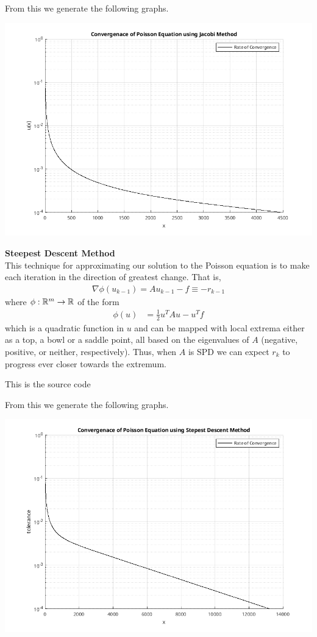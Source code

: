 \documentclass[12pt,a4paper]{report}
\begin{document}
From this we generate the following graphs.%

\includegraphics[scale=0.5]{ml04c.png} 

\noindent\textbf{Steepest Descent Method}\\

This technique for approximating our solution to the Poisson equation is to make each iteration in the direction of greatest change.  That is, 
\begin{align*}
	\nabla \phi(u_{k-1}) = Au_{k-1}-f \equiv -r_{k-1}
\end{align*}where $\phi: \mathbb{R}^m \to \mathbb{R}$ of the form
\begin{align*}
	\phi(u) &= \frac{1}{2}u^TAu-u^Tf
\end{align*}which is a quadratic function in $u$ and can be mapped with local extrema either as a top, a bowl or a saddle point, all based on the eigenvalues of $A$ (negative, positive, or neither, respectively).  Thus, when $A$ is SPD we can expect $r_{k}$ to progress ever closer towards the extremum.

This is the source code
	

From this we generate the following graphs.

\includegraphics[scale=0.5]{ml04d.png} 
\end{document}
